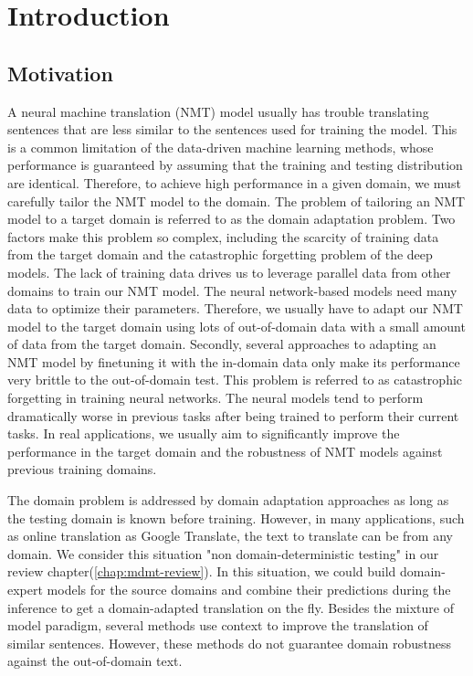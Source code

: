 \chapter{Introduction}
\section{Motivation}
A neural machine translation (NMT) model usually has trouble translating sentences that are less similar to the sentences used for training the model. This is a common limitation of the data-driven machine learning methods, whose performance is guaranteed by assuming that the training and testing distribution are identical. Therefore, to achieve high performance in a given domain, we must carefully tailor the NMT model to the domain. The problem of tailoring an NMT model to a target domain is referred to as the domain adaptation problem. Two factors make this problem so complex, including the scarcity of training data from the target domain and the catastrophic forgetting problem of the deep models. The lack of training data drives us to leverage parallel data from other domains to train our NMT model. The neural network-based models need many data to optimize their parameters. Therefore, we usually have to adapt our NMT model to the target domain using lots of out-of-domain data with a small amount of data from the target domain. Secondly, several approaches to adapting an NMT model by finetuning it with the in-domain data only make its performance very brittle to the out-of-domain test. This problem is referred to as catastrophic forgetting in training neural networks. The neural models tend to perform dramatically worse in previous tasks after being trained to perform their current tasks. In real applications, we usually aim to significantly improve the performance in the target domain and the robustness of NMT models against previous training domains.

The domain problem is addressed by domain adaptation approaches as long as the testing domain is known before training. However, in many applications, such as online translation as Google Translate, the text to translate can be from any domain. We consider this situation "non domain-deterministic testing" in our review chapter(\ref{chap:mdmt-review}). In this situation, we could build domain-expert models for the source domains and combine their predictions during the inference \citep{Saunders19domain} to get a domain-adapted translation on the fly. Besides the mixture of model paradigm, several methods use context to improve the translation of similar sentences. However, these methods do not guarantee domain robustness against the out-of-domain text.

